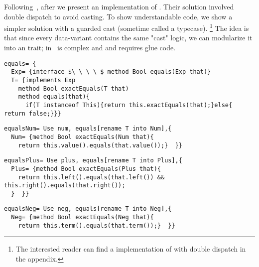 Following~\cite{Zenger-Odersky2005}, after \Q@double@ we present an implementation of \Q@equals@.
Their solution involved double dispatch to avoid casting.
To show understandable code, we show a simpler solution 
with a guarded cast (sometime called a typecase).%
\footnote{
The interested reader can find a \name implementation of \Q@equals@ with double dispatch
in the appendix.
}
The idea is that since every data-variant contains
 the same "cast" logic, 
 we can modularize it into an \Q@equals@ trait;
\Q@equals@ in~\cite{Zenger-Odersky2005} is complex and
 and requires glue code.
\begin{lstlisting}
equals= {
  Exp= {interface $\ \ \ \ $ method Bool equals(Exp that)}
  T= {implements Exp
    method Bool exactEquals(T that)
    method equals(that){
      if(T instanceof This){return this.exactEquals(that);}else{ return false;}}}
\end{lstlisting}
\multiCode
\begin{lstlisting}
equalsNum= Use num, equals[rename T into Num],{
  Num= {method Bool exactEquals(Num that){
    return this.value().equals(that.value());}  }}
\end{lstlisting}
\multiCode
\begin{lstlisting}
equalsPlus= Use plus, equals[rename T into Plus],{
  Plus= {method Bool exactEquals(Plus that){
    return this.left().equals(that.left()) && this.right().equals(that.right());
  }  }}
\end{lstlisting}
\multiCode
\begin{lstlisting}
equalsNeg= Use neg, equals[rename T into Neg],{
  Neg= {method Bool exactEquals(Neg that){
    return this.term().equals(that.term());}  }}
\end{lstlisting}

